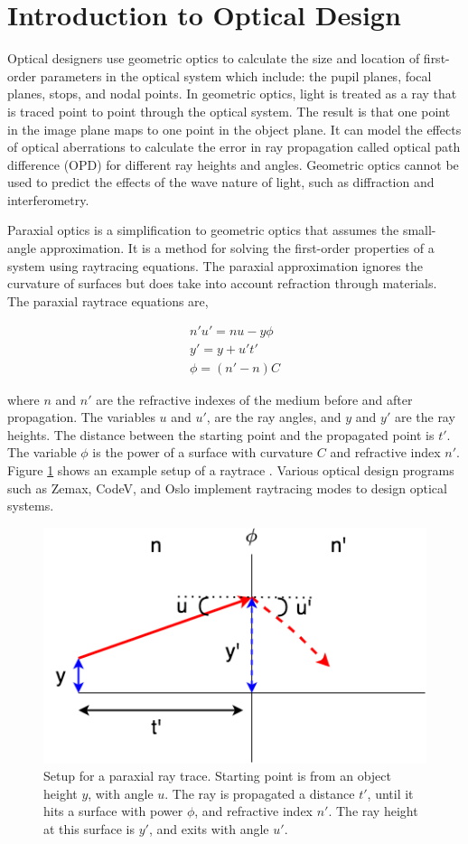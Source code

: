 \section{Introduction to Optical Design}

Optical designers use geometric optics to calculate the size and location of first-order parameters in the optical system which include: the pupil planes, focal planes, stops, and nodal points. In geometric optics, light is treated as a ray that is traced point to point through the optical system. The result is that one point in the image plane maps to one point in the object plane. It can model the effects of optical aberrations to calculate the error in ray propagation called optical path difference (OPD) for different ray heights and angles. Geometric optics cannot be used to predict the effects of the wave nature of light, such as diffraction and interferometry. 

Paraxial optics is a simplification to geometric optics that assumes the small-angle approximation. It is a method for solving the first-order properties of a system using raytracing equations. The paraxial approximation ignores the curvature of surfaces but does take into account refraction through materials. The paraxial raytrace equations are,

\begin{eqnarray}
       n'u'=nu -y\phi  \label{4PWFSslopes} \\
       y'=y+u't' \nonumber \\
       \phi =(n'-n)C
\end{eqnarray}

where $n$ and $n'$ are the refractive indexes of the medium before and after propagation. The variables $u$ and $u'$, are the ray angles, and $y$ and $y'$ are the ray heights. The distance between the starting point and the propagated point is $t'$. The variable $\phi$ is the power of a surface with curvature $C$ and refractive index $n'$. Figure \ref{fig:paraxial} shows an example setup of a raytrace \citep{greivenkamp2004field}. Various optical design programs such as Zemax, CodeV, and Oslo implement raytracing modes to design optical systems. 


\begin{figure}
    \centering
    \includegraphics[width=.5\textwidth]{Chapter Materials/Chapter Three Materials/paraxialray.png}
    \caption{Setup for a paraxial ray trace. Starting point is from an object height $y$, with angle $u$. The ray is propagated a distance $t'$, until it hits a surface with power $\phi$, and refractive index $n'$. The ray height at this surface is $y'$, and exits with angle $u'$.}
    \label{fig:paraxial}
\end{figure}




